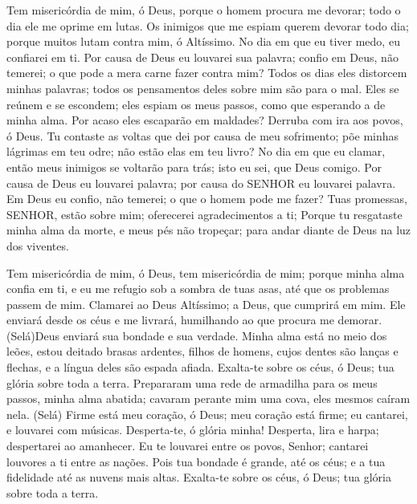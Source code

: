 
{\PP 
  Tem misericórdia de mim, ó Deus, porque o homem procura me devorar; todo o dia ele me oprime em lutas.
  Os inimigos que me espiam querem
{} devorar todo dia; porque muitos lutam contra mim, ó Altíssimo.
  No dia em que eu tiver medo, eu confiarei em ti.
  Por causa de Deus eu louvarei sua palavra; confio em Deus, não temerei; o que pode a mera carne
 fazer contra mim?
  Todos os dias eles distorcem minhas palavras; todos os pensamentos deles sobre mim são para o mal.
  Eles se reúnem e se escondem; eles espiam os meus passos, como que esperando a
{} de minha alma.
  Por acaso eles escaparão em
{} maldades? Derruba com ira aos povos, ó Deus.
  Tu contaste as voltas que dei por causa de meu sofrimento; põe minhas lágrimas em teu odre; não estão elas em teu livro?
  No dia em que eu clamar, então meus inimigos se voltarão para trás; isto eu sei, que Deus
{} comigo.
  Por causa de Deus eu louvarei
{} palavra; por causa do SENHOR eu louvarei
{} palavra.
  Em Deus eu confio, não temerei; o que o homem pode me fazer?
  Tuas promessas, SENHOR, estão sobre mim; oferecerei agradecimentos a ti;
  Porque tu resgataste minha alma da morte, e meus pés não
{} tropeçar; para
{} andar diante de Deus na luz dos viventes.
\par }


{\PP 
  Tem misericórdia de mim, ó Deus, tem misericórdia de mim; porque minha alma confia em ti, e eu me refugio sob a sombra de tuas asas, até que os
{} problemas passem de mim.
  Clamarei ao Deus Altíssimo; a Deus, que cumprirá
{} em mim.
  Ele enviará desde os céus e me livrará, humilhando ao que procura me demorar. (Selá)Deus enviará sua bondade e sua verdade.
  Minha alma está no meio dos leões, estou deitado
{} brasas ardentes, filhos de homens, cujos dentes são lanças e flechas, e a língua deles são espada afiada.
  Exalta-te sobre os céus, ó Deus;
{} tua glória sobre toda a terra.
  Prepararam uma rede de armadilha para os meus passos, minha alma
{} abatida; cavaram perante mim uma cova,
{} eles mesmos caíram nela. (Selá)
  Firme está meu coração, ó Deus; meu coração está firme; eu cantarei, e louvarei com músicas.
  Desperta-te, ó glória minha! Desperta, lira e harpa; despertarei ao amanhecer.
  Eu te louvarei entre os povos, Senhor; cantarei louvores a ti entre as nações.
  Pois tua bondade é grande,
{} até os céus; e a tua fidelidade até as nuvens mais altas.
  Exalta-te sobre os céus, ó Deus;
{} tua glória sobre toda a terra.
\par }


